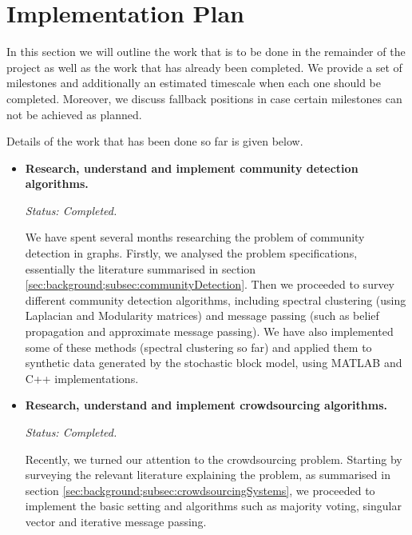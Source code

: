 \documentclass[12pt]{article}
\numberwithin{equation}{section}
\begin{document}

\newpage
\thispagestyle{plain}
\mbox{}
\section {Implementation Plan}
\label{sec:implementationPlan}

In this section we will outline the work that is to be done in the remainder of the project as well as the work that has already been completed. We provide a set of milestones and additionally an estimated timescale when each one should be completed. Moreover, we discuss fallback positions in case certain milestones can not be achieved as planned.

Details of the work that has been done so far is given below.
\begin{itemize}
	\item \textbf{Research, understand and implement community detection algorithms.}

	\textit{Status: Completed.}	

	We have spent several months researching the problem of community detection in graphs. Firstly, we analysed the problem specifications, essentially the literature summarised in section \ref{sec:background;subsec:communityDetection}. Then we proceeded to survey different community detection algorithms, including spectral clustering (using Laplacian and Modularity matrices) and message passing (such as belief propagation and approximate message passing). We have also implemented some of these methods (spectral clustering so far) and applied them to synthetic data generated by the stochastic block model, using MATLAB and C++ implementations.

	\item \textbf{Research, understand and implement crowdsourcing algorithms.}

	\textit{Status: Completed.}

	Recently, we turned our attention to the crowdsourcing problem. Starting by surveying the relevant literature explaining the problem, as summarised in section \ref{sec:background;subsec:crowdsourcingSystems}, we proceeded to implement the basic setting and algorithms such as majority voting, singular vector and iterative message passing.
\end{itemize}
\end{document}

